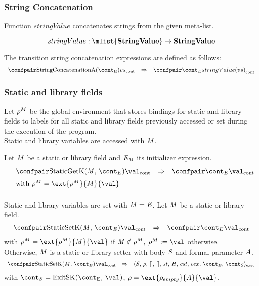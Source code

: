 \documentclass{article}
\begin{document}
\subsubsection{String Concatenation}
\label{subsubsec:string-concatenation}
Function $stringValue$ concatenates strings from the given meta-list.

\[stringValue : \mlist{\dstring} \rightarrow \dstring\]

\noindent
The transition string concatenation expressions are defined as follows:
\[
  \begin{array}{rcl}
	\cesktrans{
		\contconf{\StringConcatenationA}{\vals}}{
		\contconf{\econt}{stringValue(\vals)}}
  \end{array}
\]


\subsubsection{Static and library fields}
\label{subsubsec:static-and-library-fields}

Let $\rho^{M}$ be the global environment that stores bindings for static and library fields to labels for all static and library fields previously accessed or set during the execution of the program.\\
Static and library variables are accessed with $\mathit{M}$.

\noindent
Let $\mathit{M}$ be a static or library field and $\mathit{E}_{\mathit{M}}$ its initializer expression.
\[
  \begin{array}{rlcl}
	&\cesktrans{
		\contconf{\StaticGetK}{\val}}{
		\contconf{\econt}{\val}}
		\\[2mm]
	&\textrm{with }\env^{M} = \ext{\env^{M}}{\membermeta}{\val}
	\\[2mm]
  \end{array}
\]

Static and library variables are set with $\mathit{M}=\mathit{E}$.
Let $\mathit{M}$ be a static or library field.
\[
  \begin{array}{rcl}
	\cesktrans{
		\contconf{\StaticSetK}{\val}}{
		\contconf{\econt}{\val}}
  \end{array}
\]
with $\env^{M} = \ext{\env^{M}}{\membermeta}{\val}$ if $\mathit{M} \notin \rho^M,$ $\update{\env^{M}}{\val}$ otherwise.\\

\noindent
Otherwise, $\mathit{M}$ is a static or library setter with body $\mathit{S}$ and formal parameter $A$.
\[
  \begin{array}{lcl}
	\cesktrans{
		\contconf{\StaticSetK}{\val}}{
		\execconf{\stmt}{\env}{[]}{[]}{\handler}{\cstrace}{\cex}{\econt}{\scont}}
  \end{array}
\]
with $\scont = \ExitSK{\val}$, $\env = \ext{\env_{empty}}{\formal}{\val}$.
\end{document}
